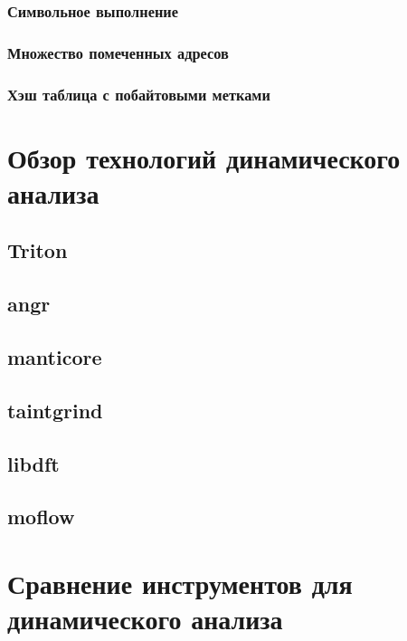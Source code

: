\begin{itemize}
\subsubsection{Символьное выполнение}

\subsubsection{Множество помеченных адресов}

\subsubsection{Хэш таблица с побайтовыми метками}


\section{Обзор технологий динамического анализа}

\subsection{Triton}

\subsection{angr}

\subsection{manticore}

\subsection{taintgrind}

\subsection{libdft}

\subsection{moflow}



\section{Сравнение инструментов для динамического анализа}


\end{itemize}
